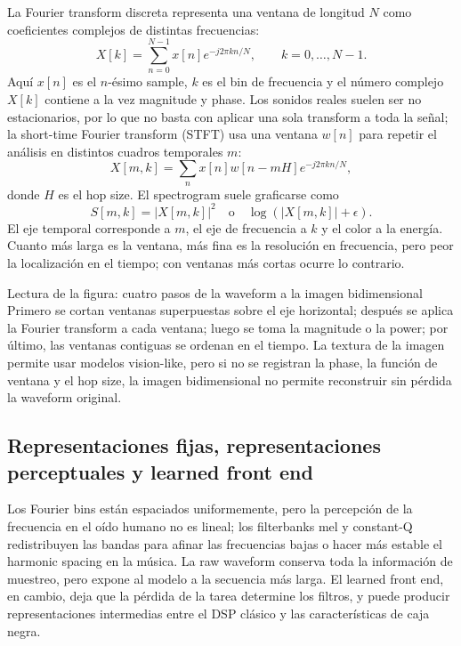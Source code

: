 La Fourier transform discreta representa una ventana de longitud $N$ como coeficientes complejos de distintas frecuencias:
\[
X[k]=\sum_{n=0}^{N-1}x[n]e^{-j2\pi kn/N},
\qquad k=0,\ldots,N-1.
\]
Aquí $x[n]$ es el $n$-ésimo sample, $k$ es el bin de frecuencia y el número complejo $X[k]$ contiene a la vez magnitude y phase. Los sonidos reales suelen ser no estacionarios, por lo que no basta con aplicar una sola transform a toda la señal; la short-time Fourier transform (STFT) usa una ventana $w[n]$ para repetir el análisis en distintos cuadros temporales $m$:
\[
X[m,k]=\sum_n x[n]w[n-mH]e^{-j2\pi kn/N},
\]
donde $H$ es el hop size. El spectrogram suele graficarse como
\[
S[m,k]=|X[m,k]|^2
\quad\text{o}\quad \log(|X[m,k]|+\epsilon).
\]
El eje temporal corresponde a $m$, el eje de frecuencia a $k$ y el color a la energía. Cuanto más larga es la ventana, más fina es la resolución en frecuencia, pero peor la localización en el tiempo; con ventanas más cortas ocurre lo contrario.


\begin{knowledgebox}{Lectura de la figura: cuatro pasos de la waveform a la imagen bidimensional}
Primero se cortan ventanas superpuestas sobre el eje horizontal; después se aplica la Fourier transform a cada ventana; luego se toma la magnitude o la power; por último, las ventanas contiguas se ordenan en el tiempo. La textura de la imagen permite usar modelos vision-like, pero si no se registran la phase, la función de ventana y el hop size, la imagen bidimensional no permite reconstruir sin pérdida la waveform original.
\end{knowledgebox}


\subsection{Representaciones fijas, representaciones perceptuales y learned front end}

Los Fourier bins están espaciados uniformemente, pero la percepción de la frecuencia en el oído humano no es lineal; los filterbanks mel y constant-Q redistribuyen las bandas para afinar las frecuencias bajas o hacer más estable el harmonic spacing en la música. La raw waveform conserva toda la información de muestreo, pero expone al modelo a la secuencia más larga. El learned front end, en cambio, deja que la pérdida de la tarea determine los filtros, y puede producir representaciones intermedias entre el DSP clásico y las características de caja negra.

